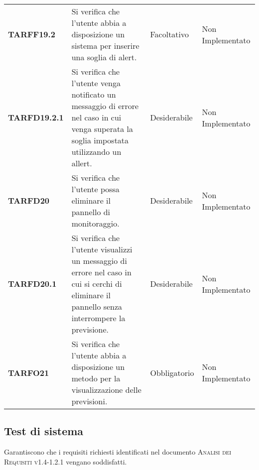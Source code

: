 \documentclass[../piano-di-qualifica.tex]{subfiles}
\begin{document}
\begin{longtable}[H]{>{\centering\bfseries}m{2.5cm} >{\centering}m{7.5cm} >{\centering}m{2.5cm} >{\centering\arraybackslash}m{3.5cm}}
  \textbf{TARFF19.2} & Si verifica che l'utente abbia a disposizione un sistema per inserire una soglia di alert. & Facoltativo & Non Implementato \\
  \textbf{TARFD19.2.1} & Si verifica che l'utente venga notificato un messaggio di errore nel caso in cui venga superata la soglia impostata utilizzando un allert. & Desiderabile & Non Implementato \\
  \textbf{TARFD20} & Si verifica che l'utente possa eliminare il pannello di monitoraggio. & Desiderabile & Non Implementato \\
  \textbf{TARFD20.1} & Si verifica che l'utente visualizzi un messaggio di errore nel caso in cui si cerchi di eliminare il pannello senza interrompere la previsione. & Desiderabile & Non Implementato \\
  \textbf{TARFO21} & Si verifica che l'utente abbia a disposizione un metodo per la visualizzazione delle previsioni. & Obbligatorio & Non Implementato \\
\end{longtable}




\subsection{Test di sistema}
\label{sub:test_di_sistema}
Garantiscono che i requisiti richiesti identificati nel documento \textsc{Analisi dei Requisiti v1.4-1.2.1} vengano soddisfatti.
\end{document}
